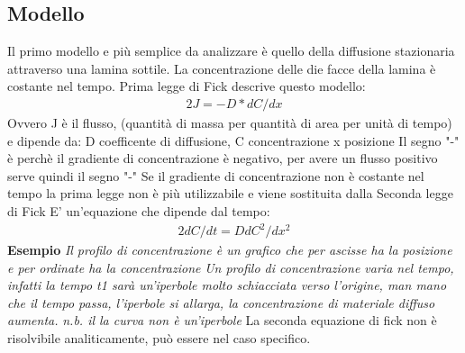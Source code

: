 \documentclass{article}%
\begin{document}
\subsection{ Modello }%
\label{subsec:Modello}%
Il primo modello e più semplice da analizzare è quello della diffusione stazionaria attraverso una lamina sottile.\newline%
%
La concentrazione delle die facce della lamina è costante nel tempo.\newline%
%
Prima legge di Fick descrive questo modello:\newline%
%
\begin{alignat}{2}%
J = -D * dC/dx
%
\end{alignat}%
Ovvero J è il flusso, (quantità di massa per quantità di area per unità di tempo) e dipende da:\newline%
%
D coefficente di diffusione,\newline%
%
C concentrazione\newline%
%
x posizione\newline%
%
Il segno "{-}" è perchè il gradiente di concentrazione è negativo, per avere un flusso positivo serve quindi il segno "{-}"\newline%
%
\newline%
%
Se il gradiente di concentrazione non è costante nel tempo la prima legge non è più utilizzabile e viene sostituita dalla\newline%
%
Seconda legge di Fick\newline%
%
E' un'equazione che dipende dal tempo:\newline%
%
\begin{alignat}{2}%
dC/dt = D dC^2/dx^2
%
\end{alignat}%
\newline%
%
\textbf{ Esempio \newline%
}%
\textit{Il profilo di concentrazione è un grafico che per ascisse ha la posizione e per ordinate ha la concentrazione\newline%
}%
\textit{Un profilo di concentrazione varia nel tempo, infatti la tempo t1 sarà un'iperbole molto schiacciata verso l'origine, man mano che il tempo passa, l'iperbole si allarga, la concentrazione di materiale diffuso aumenta.\newline%
}%
\textit{n.b. il la curva non è un'iperbole\newline%
}%
\newline%
%
La seconda equazione di fick non è risolvibile analiticamente, può essere nel caso specifico.\newline%
\end{document}
